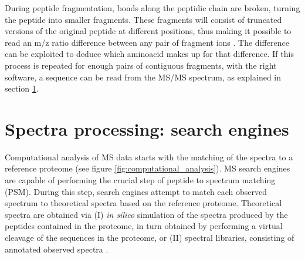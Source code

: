 During peptide fragmentation, bonds along the peptidic chain are broken, turning the peptide into smaller fragments. These fragments will consist of truncated versions of the original peptide at different positions, thus making it possible to read an \ac{m/z} ratio difference between any pair of fragment ions \cite{Barsnes2008}. The difference can be exploited to deduce which aminoacid makes up for that difference. If this process is repeated for enough pairs of contiguous fragments, with the right software, a sequence can be read from the \ac{MS/MS} spectrum, as  explained in section \ref{sec:search_engines}.




%
%
 
\section{Spectra processing: search engines}
\label{sec:search_engines}

Computational analysis of MS data starts with the matching of the spectra to a reference proteome (see figure \ref{fig:computational_analysis}). \ac{MS} search engines are capable of performing the crucial step of peptide to spectrum matching (PSM). During this step, search engines attempt to match each observed spectrum to theoretical spectra based on the reference proteome. Theoretical spectra are obtained via (I) \textit{in silico} simulation of the spectra produced by the peptides contained in the proteome, in turn obtained by performing a virtual cleavage of the sequences in the proteome, or (II) spectral libraries, consisting of annotated observed spectra \cite{Li2012}.


